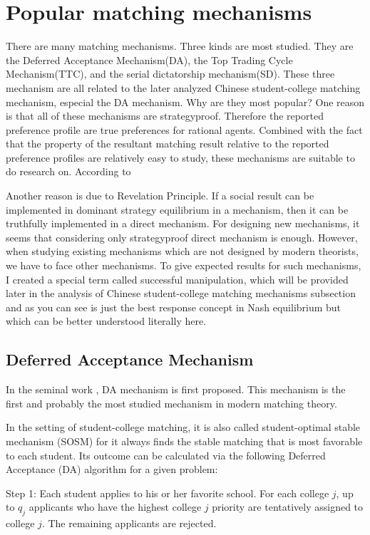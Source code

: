 \section{Popular matching mechanisms}

There are many matching mechanisms. Three kinds are
most studied. They are the Deferred Acceptance Mechanism(DA), the Top
Trading Cycle Mechanism(TTC), and the serial dictatorship mechanism(SD).
These three mechanism are all related to the later analyzed Chinese
student-college matching mechanism, especial the DA mechanism. Why are they most popular? 
One reason is that all of these mechanisms are
strategyproof. Therefore the reported preference profile are true preferences
for rational agents.  Combined with the fact that  the property of the resultant matching result
relative to the reported preference profiles are relatively easy to
study, these mechanisms are suitable to do research on. According to 

 Another reason
is due to Revelation  Principle.  If a social result can be
implemented in dominant strategy equilibrium in a mechanism, then it
can be truthfully implemented in a direct mechanism. For designing new
mechanisms, it seems that considering only strategyproof direct mechanism is
enough.  However, when studying existing mechanisms which are not
designed by modern theorists, we have to face other mechanisms.  To
give expected results for such mechanisms, I created a special term called
successful manipulation, which will be provided later in the analysis
of Chinese student-college matching mechanisms subsection and as you
can see is just the best response concept in Nash equilibrium but
which can be better understood literally here. 

\subsection{Deferred Acceptance Mechanism}
In the seminal work \parencite{Gale1962}, DA mechanism is first
proposed. This mechanism is the first and probably the most studied
mechanism in modern matching theory. 

In the setting of student-college matching, it is also called
student-optimal stable mechanism (SOSM) for it always finds the stable
matching that is most favorable to each student. Its outcome can be
calculated via the following Deferred
Acceptance (DA) algorithm for a given problem:

 Step 1: Each student applies to his or her favorite school. For each
college $j$, up to $q_j$  applicants who have
the highest college $j$ priority are tentatively assigned to college $j$. The remaining applicants are
rejected.

